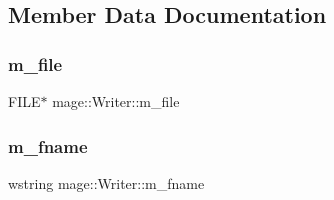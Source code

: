 \subsection{Member Data Documentation}
\hypertarget{classmage_1_1_writer_a04428b72245b50d45c62cbd23c2f039a}{}\label{classmage_1_1_writer_a04428b72245b50d45c62cbd23c2f039a} 
\subsubsection{\texorpdfstring{m\+\_\+file}{m\_file}}
{\footnotesize\ttfamily F\+I\+LE$\ast$ mage\+::\+Writer\+::m\+\_\+file\hspace{0.3cm}{\ttfamily [private]}}

\hypertarget{classmage_1_1_writer_afa271ee47897d4961e9d62132d8faeb5}{}\label{classmage_1_1_writer_afa271ee47897d4961e9d62132d8faeb5} 
\subsubsection{\texorpdfstring{m\+\_\+fname}{m\_fname}}
{\footnotesize\ttfamily wstring mage\+::\+Writer\+::m\+\_\+fname\hspace{0.3cm}{\ttfamily [private]}}

